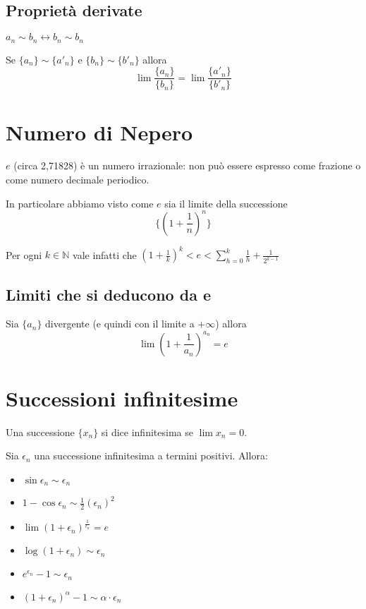 \subsection{Proprietà derivate}

${a_{n}} \sim {b_{n}} \leftrightarrow {b_{n}} \sim {b_{n}}$

Se $\{a_{n}\} \sim \{a'_{n}\}$ e $\{b_{n}\} \sim \{b'_{n}\}$ allora $$\lim \frac{\{a_{n}\}}{\{b_{n}\}} = \lim \frac{\{a'_{n}\}}{\{b'_{n}\}}$$


\section{Numero di Nepero}

$e$ (circa 2,71828) è un numero irrazionale: non può essere espresso come frazione o come numero decimale periodico.

In particolare abbiamo visto come $e$ sia il limite della successione 
$$\{(1+\frac{1}{n})^{n}\}$$
 
Per ogni $k \in \mathbb{N}$ vale infatti che $ (1+\frac{1}{k})^{k} < e < \sum\limits_{h=0}^{k} \frac{1}{h} + \frac{1}{2^{k-1}}$

\subsection{Limiti che si deducono da e}

Sia $\{a_{n}\}$ divergente (e quindi con il limite a $+\infty$) allora $$\lim (1+\frac{1}{a_{n}})^{a_{n}} = e$$

\section{Successioni infinitesime}

Una successione $\{x_{n}\}$ si dice infinitesima se $\lim x_n = 0$.

Sia $\epsilon_n$ una successione infinitesima a termini positivi. Allora:

\begin{itemize}
\item $\sin \epsilon_n \sim \epsilon_n$
\item $1 - \cos \epsilon_n \sim \frac{1}{2} (\epsilon_n)^2$
\item $\lim (1+\epsilon_n)^\frac{1}{\epsilon_n} = e$
\item $\log (1 + \epsilon_n) \sim \epsilon_n$
\item $e^{\epsilon_n} - 1 \sim \epsilon_n$
\item $(1+\epsilon_n)^\alpha - 1 \sim \alpha \cdot \epsilon_n$
\end{itemize}
